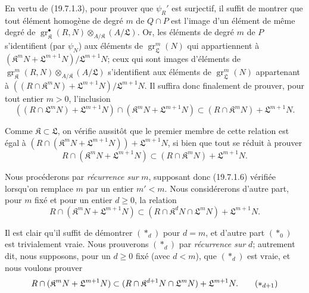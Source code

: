 \begin{env}[19.7.1.5]
\label{IV.19.7.1.5}
En vertu de (19.7.1.3), pour prouver que $\psi_R'$ est surjectif, il suffit de montrer que tout élément homogène de degré $m$ de $Q\cap P$ est l'image d'un élément de même degré de $\operatorname{gr}_{\mathfrak K}^\bullet(R,N)\otimes_{A/\mathfrak K}(A/\mathfrak L)$. Or, les éléments de degré $m$ de $P$ s'identifient (par $\psi_N$) aux éléments de $\operatorname{gr}_{\mathfrak L}^m(N)$ qui appartiennent à $(\mathfrak K^mN+\mathfrak L^{m+1}N)/\mathfrak L^{m+1}N$; ceux qui sont images d'éléments de $\operatorname{gr}_{\mathfrak K}^m(R,N)\otimes_{A/\mathfrak K}(A/\mathfrak L)$ s'identifient aux éléments de $\operatorname{gr}_{\mathfrak L}^m(N)$ appartenant à $((R\cap\mathfrak K^mN)+\mathfrak L^{m+1}N)/\mathfrak L^{m+1}N$. Il suffira donc finalement de prouver, pour tout entier $m>0$, l'inclusion
\[
  ((R\cap\mathfrak L^mN)+\mathfrak L^{m+1}N)\cap(\mathfrak K^mN+\mathfrak L^{m+1}N)\subset(R\cap\mathfrak K^mN)+\mathfrak L^{m+1}N.
\]

Comme $\mathfrak K\subset\mathfrak L$, on vérifie aussitôt que le premier membre de cette relation est égal à $(R\cap(\mathfrak K^mN+\mathfrak L^{m+1}N))+\mathfrak L^{m+1}N$, si bien que tout se réduit à prouver
\begin{equation}
  R\cap(\mathfrak K^mN+\mathfrak L^{m+1}N)\subset(R\cap\mathfrak K^mN)+\mathfrak L^{m+1}N.
  \tag{19.7.1.6}\label{IV.19.7.1.6}
\end{equation}
\end{env}


Nous procéderons par \emph{récurrence sur} $m$, supposant donc (19.7.1.6) vérifiée lorsqu'on remplace $m$ par un entier $m'<m$. Nous considérerons d'autre part, pour $m$ fixé et pour un entier $d\geq0$, la relation
\begin{equation}
  R\cap(\mathfrak K^mN+\mathfrak L^{m+1}N)\subset(R\cap\mathfrak K^dN\cap\mathfrak L^mN)+\mathfrak L^{m+1}N.
  \tag{$*_d$}
\end{equation}

Il est clair qu'il suffit de démontrer $(*_d)$ pour $d=m$, et d'autre part $(*_0)$ est trivialement vraie. Nous prouverons $(*_d)$ par \emph{récurrence sur} $d$; autrement dit, nous supposons, pour un $d\geq0$ fixé (avec $d<m$), que $(*_d)$ est vraie, et nous voulons prouver
\begin{equation}
  R\cap(\mathfrak K^mN+\mathfrak L^{m+1}N)\subset(R\cap\mathfrak K^{d+1}N\cap\mathfrak L^mN)+\mathfrak L^{m+1}N.
  \tag{$*_{d+1}$}
\end{equation}

